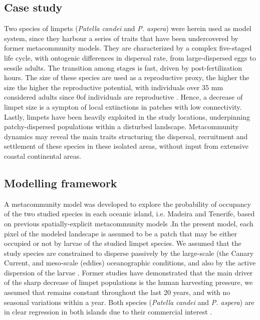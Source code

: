 \documentclass[12pt]{article}
\begin{document}
\begin{justify}
{{{{{\subsection{Case study}
Two species of limpets (\textit{Patella candei} and \textit{P. aspera}) were herein used as model system, since they harbour a series of traits that have been undercovered by former metacommunity models. They are characterized by a complex five-staged life cycle, with ontogenic differences in dispersal rate, from large-dispersed eggs to sessile adults. The transition among stages is fast, driven by post-fertilization hours. The size of these species are used as a reproductive proxy, the higher the size the higher the reproductive potential, with individuals over 35 mm considered adults since 0\percent of individuals are reproductive \citep{henriques2012life}. Hence, a decrease of limpet size is a sympton of local extinctions in patches with low connectivity. Lastly, limpets have been heavily exploited in the study locations, underpinning patchy-dispersed populations within a disturbed landscape. Metacommunity dynamics may reveal the main traits structuring the dispersal, recruitment and settlement of these species in these isolated areas, without input from extensive coastal continental areas.

\subsection{Modelling framework}
A metacommunity model was developed to explore the probability of occupancy of the two studied species in each oceanic island, i.e. Madeira and Tenerife, based on previous spatially-explicit metacommunity models \citep{hanski1999habitat,hanski2000metapopulation, ovaskainen2001spatially, hanski2002extinction, bertuzzo2015metapopulation}.In the present model, each pixel of the modeled landscape is assumed to be a patch that may be either occupied or not by larvae of the studied limpet species. We assumed that the study species are constrained to disperse passively by the large-scale (the Canary Current, \citep{barton1998transition} and meso-scale (eddies) oceanographic conditions, and also by the active dispersion of the larvae \citep{henriques2012life}. Former studies have demonstrated that the main driver of the sharp decrease of limpet populations is the human harvesting pressure, we assumed that remains constant throughout the last 20 years, and with no seasonal variations within a year. Both species (\textit{Patella candei} and \textit{P. aspera}) are in clear regression in both islands due to their commercial interest \citep{riera2016clear, sousa2019long}.

}}}}}
\end{justify}
\end{document}
